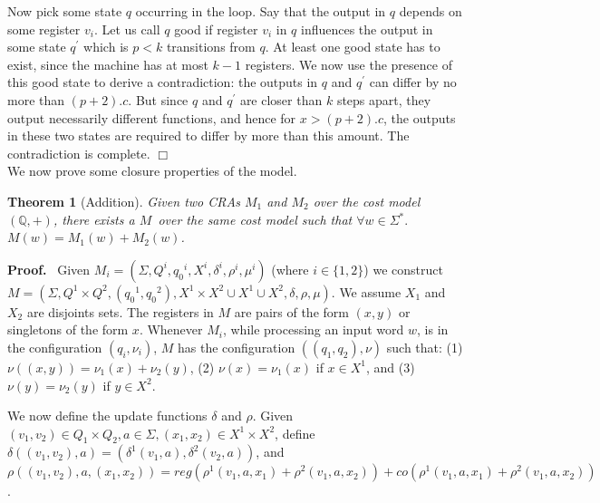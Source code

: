 \documentclass[11pt]{article}
\newtheorem{theorem}{Theorem}
\def\Proof{{\bf Proof.}}
\def\qed{{\bf $\Box$}}
\def\qed{{\bf $\Box$}}
\newcommand{\st}{\ensuremath{^*}}
\newcommand{\Rat}{\ensuremath{\mathbb{Q}}}
\newcommand{\inputalph}{\ensuremath{\Sigma}}
\newcommand{\valuation}{\ensuremath{\nu}}
\newcommand{\edwa}{\ensuremath{M}}
\newcommand{\edwastates}{\ensuremath{Q}}
\newcommand{\edwastate}{\ensuremath{q}}
\newcommand{\edwainitst}{\ensuremath{\edwastate_0}}
\newcommand{\edwavariables}{\ensuremath{X}}
\newcommand{\edwatrans}{\ensuremath{\delta}}
\newcommand{\edwavarup}{\ensuremath{\rho}}
\newcommand{\edwafinal}{\ensuremath{\mu}}
\begin{document}
Now pick some state $q$ occurring in the loop. Say that the output in
$q$ depends on some register $v_{i}$. Let us call $q$ good if register
$v_{i}$ in $q$ influences the output in some state $q^{\prime}$ which
is $p < k$ transitions from $q$. At least one good state has to exist,
since the machine has at most $k-1$ registers. We now use the presence
of this good state to derive a contradiction: the outputs in $q$ and
$q^{\prime}$ can differ by no more than $(p + 2).c$. But since $q$ and
$q^{\prime}$ are closer than $k$ steps apart, they output necessarily
different functions, and hence for $x > (p + 2).c$, the outputs in
these two states are required to differ by more than this amount. The
contradiction is complete.
\qed \\

We now prove some closure properties of the model.

\begin{theorem}[Addition]
Given two CRAs $\edwa_1$ and $\edwa_2$ over the cost model $(\Rat,+)$,
there exists a \edwa~over the same cost model such that $\forall
w\in\Sigma\st.$ $M(w)=M_1(w)+M_2(w)$.
\end{theorem}

\Proof~ Given $\edwa_i = (\inputalph, \edwastates^i, \edwainitst^i,
\edwavariables^i, \edwatrans^i, \edwavarup^i, \edwafinal^i)$ (where
$i\in\{1,2\}$) we construct $\edwa=(\inputalph,
\edwastates^1\times\edwastates^2, (\edwainitst^1,\edwainitst^2),
\edwavariables^1\times\edwavariables^2\cup\edwavariables^1\cup\edwavariables^2,
\edwatrans, \edwavarup, \edwafinal)$. We assume $\edwavariables_1$ and
$\edwavariables_2$ are disjoints sets.  The registers in $\edwa$ are
pairs of the form $(x,y)$ or singletons of the form $x$.  Whenever
$\edwa_i$, while processing an input word $w$, is in the configuration
$(\edwastate_i,\valuation_i)$, $\edwa$ has the configuration
$((\edwastate_1,\edwastate_2),\valuation)$ such that:
(1) $\valuation((x,y))=\valuation_1(x)+\valuation_2(y)$,
(2) $\valuation(x)=\valuation_1(x)$ if $x\in\edwavariables^1$, and
(3) $\valuation(y)=\valuation_2(y)$ if $y\in\edwavariables^2$.

We now define the update functions $\edwatrans$ and $\edwavarup$.
Given $(v_1,v_2)\in\edwastates_1\times\edwastates_2, a\in\inputalph,
(x_1,x_2)\in\edwavariables^1\times\edwavariables^2$, define
$\edwatrans((v_1,v_2),a)=(\edwatrans^1(v_1,a),\edwatrans^2(v_2,a))$,
and
$\edwavarup((v_1,v_2),a,(x_1,x_2))=reg(\edwavarup^1(v_1,a,x_1)+\edwavarup^2(v_1,a,x_2))+co(\edwavarup^1(v_1,a,x_1)+\edwavarup^2(v_1,a,x_2))$.
\end{document}
